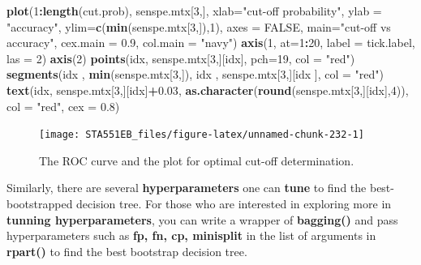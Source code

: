 \documentclass[
]{book}
\newenvironment{Shaded}{\begin{snugshade}}{\end{snugshade}}
\newcommand{\AttributeTok}[1]{\textcolor[rgb]{0.13,0.29,0.53}{#1}}
\newcommand{\ConstantTok}[1]{\textcolor[rgb]{0.56,0.35,0.01}{#1}}
\newcommand{\DecValTok}[1]{\textcolor[rgb]{0.00,0.00,0.81}{#1}}
\newcommand{\FloatTok}[1]{\textcolor[rgb]{0.00,0.00,0.81}{#1}}
\newcommand{\FunctionTok}[1]{\textcolor[rgb]{0.13,0.29,0.53}{\textbf{#1}}}
\newcommand{\NormalTok}[1]{#1}
\newcommand{\SpecialCharTok}[1]{\textcolor[rgb]{0.81,0.36,0.00}{\textbf{#1}}}
\newcommand{\StringTok}[1]{\textcolor[rgb]{0.31,0.60,0.02}{#1}}
\begin{document}
\begin{Shaded}
\begin{Highlighting}[]
  \FunctionTok{plot}\NormalTok{(}\DecValTok{1}\SpecialCharTok{:}\FunctionTok{length}\NormalTok{(cut.prob), senspe.mtx[}\DecValTok{3}\NormalTok{,], }\AttributeTok{xlab=}\StringTok{"cut{-}off probability"}\NormalTok{,}
       \AttributeTok{ylab =} \StringTok{"accuracy"}\NormalTok{, }\AttributeTok{ylim=}\FunctionTok{c}\NormalTok{(}\FunctionTok{min}\NormalTok{(senspe.mtx[}\DecValTok{3}\NormalTok{,]),}\DecValTok{1}\NormalTok{),}
               \AttributeTok{axes =} \ConstantTok{FALSE}\NormalTok{,}
        \AttributeTok{main=}\StringTok{"cut{-}off vs accuracy"}\NormalTok{,}
        \AttributeTok{cex.main =} \FloatTok{0.9}\NormalTok{,}
        \AttributeTok{col.main =} \StringTok{"navy"}\NormalTok{)}
        \FunctionTok{axis}\NormalTok{(}\DecValTok{1}\NormalTok{, }\AttributeTok{at=}\DecValTok{1}\SpecialCharTok{:}\DecValTok{20}\NormalTok{, }\AttributeTok{label =}\NormalTok{ tick.label, }\AttributeTok{las =} \DecValTok{2}\NormalTok{)}
        \FunctionTok{axis}\NormalTok{(}\DecValTok{2}\NormalTok{)}
        \FunctionTok{points}\NormalTok{(idx, senspe.mtx[}\DecValTok{3}\NormalTok{,][idx], }\AttributeTok{pch=}\DecValTok{19}\NormalTok{, }\AttributeTok{col =} \StringTok{"red"}\NormalTok{)}
        \FunctionTok{segments}\NormalTok{(idx , }\FunctionTok{min}\NormalTok{(senspe.mtx[}\DecValTok{3}\NormalTok{,]), idx , senspe.mtx[}\DecValTok{3}\NormalTok{,][idx ], }\AttributeTok{col =} \StringTok{"red"}\NormalTok{)}
       \FunctionTok{text}\NormalTok{(idx, senspe.mtx[}\DecValTok{3}\NormalTok{,][idx]}\SpecialCharTok{+}\FloatTok{0.03}\NormalTok{, }\FunctionTok{as.character}\NormalTok{(}\FunctionTok{round}\NormalTok{(senspe.mtx[}\DecValTok{3}\NormalTok{,][idx],}\DecValTok{4}\NormalTok{)), }
            \AttributeTok{col =} \StringTok{"red"}\NormalTok{, }\AttributeTok{cex =} \FloatTok{0.8}\NormalTok{)}
\end{Highlighting}
\end{Shaded}

\begin{figure}

{\centering \texttt{[image: STA551EB\_files/figure-latex/unnamed-chunk-232-1]} 

}

\caption{The ROC curve and the plot for optimal cut-off determination.}\label{fig:unnamed-chunk-232}
\end{figure}

Similarly, there are several \textbf{\color{red}hyperparameters} one can \textbf{tune} to find the best-bootstrapped decision tree. For those who are interested in exploring more in \textbf{tunning hyperparameters}, you can write a wrapper of \textbf{bagging()} and pass hyperparameters such as \textbf{fp, fn, cp, minisplit} in the list of arguments in \textbf{rpart()} to find the best bootstrap decision tree.
\end{document}
